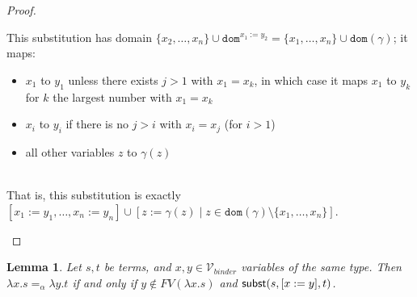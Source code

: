 \documentclass{lmcs}
\theoremstyle{theorem}\newtheorem{theorem}{Theorem}
\theoremstyle{theorem}\newtheorem{lemma}[theorem]{Lemma}
\theoremstyle{theorem}\newtheorem{corollary}[theorem]{Corollary}
\theoremstyle{definition}\newtheorem{definition}[theorem]{Definition}
\theoremstyle{definition}\newtheorem{example}[theorem]{Example}
\newcommand{\Vbound}{\mathcal{V}_{\mathit{binder}}}
\newcommand{\FV}{\mathit{FV}}
\newcommand{\domain}{\mathtt{dom}}
\newcommand{\avar}{x}
\newcommand{\bvar}{y}
\newcommand{\cvar}{z}
\newcommand{\abs}[2]{\lambda #1.#2}
\begin{document}
\begin{proof}
{\begin{itemize}
      This substitution has domain $\{\avar_2,\dots,\avar_n\} \cup \domain^{\avar_1:=\bvar_2} =
      \{\avar_1,\dots,\avar_n\} \cup \domain(\gamma)$; it maps:
      \begin{itemize}
      \item $\avar_1$ to $\bvar_1$ unless there exists $j > 1$ with $\avar_1 = \avar_k$, in which
        case it maps $\avar_1$ to $\bvar_k$ for $k$ the largest number with $\avar_1 = \avar_k$
      \item $\avar_i$ to $\bvar_i$ if there is no $j > i$ with $\avar_i = \avar_j$ (for $i > 1$)
      \item all other variables $\cvar$ to $\gamma(\cvar)$
      \end{itemize}
      \ \\
      That is, this substitution is exactly $[\avar_1:=\bvar_1,\dots,\avar_n:=\bvar_n] \cup [\cvar:=
      \gamma(\cvar) \mid \cvar \in \domain(\gamma) \setminus \{\avar_1,\dots,\avar_n\}]$.
      \qedhere
    \end{itemize}
}
\end{proof}

\begin{lemma}\label{lem:alternativealpha}
Let $s,t$ be terms, and $\avar,\bvar \in \Vbound$ variables of the same type.
Then $\abs{\avar}{s} =_\alpha \abs{\bvar}{t}$ if and only if $\bvar \notin \FV(\abs{\avar}{s})$ and $\subrel{s,[\avar:=\bvar],t}$.
\end{lemma}
\end{document}
